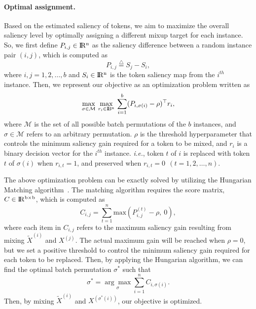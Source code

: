 \documentclass{article}
\begin{document}
\paragraph{Optimal assignment.} 
Based on the estimated saliency of tokens, we aim to maximize the overall saliency level by optimally assigning a different mixup target for each instance.
So, we first define $ P_{i,j} \in \rm I\!R^{n}$ as the saliency difference between a random instance pair $(i, j)$, which is computed as
\begin{equation}
\label{eq:definition}
    P_{i,j} \overset{\triangle}{=} S_j - S_i,
\end{equation}
where $i, j = 1, 2, \ldots, b$ and $S_i \in \rm I\!R^n$ is the token saliency map from the $i^{th}$ instance.
Then, we represent our objective as an optimization problem written as
\begin{equation}
\label{eq:htm_objective}
    \max_{\sigma \in \mathcal{M}} \: \max_{r_i \in \rm I\!B^n} \: \displaystyle \sum _{i=1}^b (P_{i, \sigma(i)}-\rho)^\top  r_i ,
\end{equation}
where $\mathcal{M}$ is the set of all possible batch permutations of the $b$ instances, and $\sigma \in \mathcal{M}$ refers to an arbitrary permutation.
$\rho$ is the threshold hyperparameter that controls the minimum saliency gain required for a token to be mixed, and $r_i$ is a binary decision vector for the $i^{th}$ instance. 
\textit{i.e.}, token $t$ of $i$ is replaced with token $t$ of $\sigma(i)$ when $r_{i,t} = 1$, and preserved when $r_{i,t} = 0 \:\: (t = 1, 2, \ldots, n)$.

The above optimization problem can be exactly solved by utilizing the Hungarian Matching algorithm~\cite{munkres1957algorithms}.
The matching algorithm requires the score matrix, $C \in \rm I\!R^{b \times b}$, which is computed as
\begin{equation}
\label{eq:matchscore}
    C_{i,j} = \displaystyle \sum_{t=1}^n \textrm{max}(P_{i,j}^{(t)} - \rho,\: 0),
\end{equation}
where each item in $C_{i,j}$ refers to the maximum saliency gain resulting from mixing $\tilde{X}^{(i)}$ and $X^{(j)}$.
The actual maximum gain will be reached when $\rho = 0$, but we set a positive threshold to control the minimum saliency gain required for each token to be replaced.
Then, by applying the Hungarian algorithm, we can find the optimal batch permutation $\sigma^*$ such that
\begin{equation}
    \sigma^* = \displaystyle \underset{\sigma}{\arg\max} \sum_{i=1}^n C_{i,\sigma(i)}.
\end{equation}
Then, by mixing $\tilde{X}^{(i)}$ and $X^{(\sigma^*(i))}$, our objective is optimized.
\end{document}
